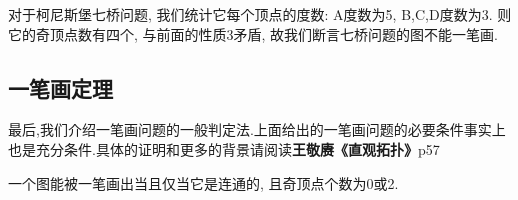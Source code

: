 \documentclass[main]{subfiles}
\begin{document}
对于柯尼斯堡七桥问题, 我们统计它每个顶点的度数: A度数为5, B,C,D度数为3.
则它的奇顶点数有四个, 与前面的性质3矛盾, 故我们断言七桥问题的图不能一笔画. 
\subsection{一笔画定理}
最后,我们介绍一笔画问题的一般判定法.上面给出的一笔画问题的必要条件事实上也是充分条件.具体的证明和更多的背景请阅读\textbf{王敬赓《直观拓扑》}p57
\begin{theorem}[一笔画定理]
  一个图能被一笔画出当且仅当它是连通的, 且奇顶点个数为0或2.
\end{theorem}
\end{document}
